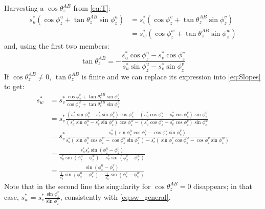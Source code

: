 \documentclass{article}
\newcommand{\MathSym}[1]{\ensuremath{#1}\xspace}
\DeclareRobustCommand{\brackets}[1]{\ensuremath{\left(#1\right)}}
\newcommand{\thetaDeltaP}{\MathSym{\theta_{z}^{AB}}}
\begin{document}
	Harvesting a $\cos \thetaDeltaP$ from \cref{eq:T}:
	\begin{align}
		\label{eq:Slopes}
		s^{*}_{u} \brackets{\cos \phi_{z}^{u} + \tan \thetaDeltaP \sin \phi_{z}^{u}} 
		  &= s^{*}_{v} \brackets{\cos \phi_{z}^{v} + \tan \thetaDeltaP \sin \phi_{z}^{v}} \nonumber \\
		  &= s^{*}_{w} \brackets{\cos \phi_{z}^{w} + \tan \thetaDeltaP \sin \phi_{z}^{w}}
	\end{align}
	and, using the first two members:
	\begin{equation*}
		\label{eq:tanAB}
		 \tan \thetaDeltaP = - \frac{s^{*}_{u} \cos \phi_{z}^{u} - s^{*}_{v} \cos \phi_{z}^{v}}{s^{*}_{u} \sin \phi_{z}^{u} - s^{*}_{v} \sin \phi_{z}^{v}}
	\end{equation*}
	If $\cos \thetaDeltaP \ne 0$, $\tan \thetaDeltaP$ is finite and we can replace its expression into \cref{eq:Slopes} to get:
	\begin{align}
		\label{eq:sw_assumption}
		s^{*}_{w} &= s^{*}_{v} \frac{\cos \phi_{z}^{v} + \tan \thetaDeltaP \sin \phi_{z}^{v}}{\cos \phi_{z}^{w} + \tan \thetaDeltaP \sin \phi_{z}^{w}} \nonumber \\
		      &= s^{*}_{v} \frac{\brackets{s^{*}_{u} \sin \phi_{z}^{u} - s^{*}_{v} \sin \phi_{z}^{v}}\cos \phi_{z}^{v} - \brackets{s^{*}_{u} \cos \phi_{z}^{u} - s^{*}_{v} \cos \phi_{z}^{v}} \sin \phi_{z}^{v}}{\brackets{s^{*}_{u} \sin \phi_{z}^{u} - s^{*}_{v} \sin \phi_{z}^{v}}\cos \phi_{z}^{w} - \brackets{s^{*}_{u} \cos \phi_{z}^{u} - s^{*}_{v} \cos \phi_{z}^{v}} \sin \phi_{z}^{w}} \nonumber \\
		      &= s^{*}_{v} \frac{s^{*}_{u} \brackets{\sin \phi_{z}^{u} \cos \phi_{z}^{v} - \cos \phi_{z}^{u} \sin \phi_{z}^{v}}}
		      {s^{*}_{u} \brackets{\sin \phi_{z}^{u} \cos \phi_{z}^{w} - \cos \phi_{z}^{u} \sin \phi_{z}^{w}} - s^{*}_{v} \brackets{\sin \phi_{z}^{v} \cos \phi_{z}^{w} - \cos \phi_{z}^{v} \sin \phi_{z}^{w}} } \nonumber \\
		      &= \frac{s^{*}_{u} s^{*}_{v} \sin \brackets{\phi_{z}^{u} - \phi_{z}^{v}}}
		      {s^{*}_{u} \sin \brackets{\phi_{z}^{u} - \phi_{z}^{w}} - s^{*}_{v} \sin \brackets{\phi_{z}^{v} - \phi_{z}^{w}}} \nonumber \\
		      &= \frac{\sin \brackets{\phi_{z}^{u} - \phi_{z}^{v}}}
		      {\frac{1}{s^{*}_{v}} \sin \brackets{\phi_{z}^{u} - \phi_{z}^{w}} - \frac{1}{s^{*}_{u}} \sin \brackets{\phi_{z}^{v} - \phi_{z}^{w}}}
	\end{align}
	Note that in the second line the singularity for $\cos \thetaDeltaP = 0$ disappears; in that case, $s^{*}_{w} = s^{*}_{v} \frac{\sin \phi_{z}^{v}}{\sin \phi_{z}^{w}}$, consistently with \cref{eq:sw_general}.
	
\end{document}
